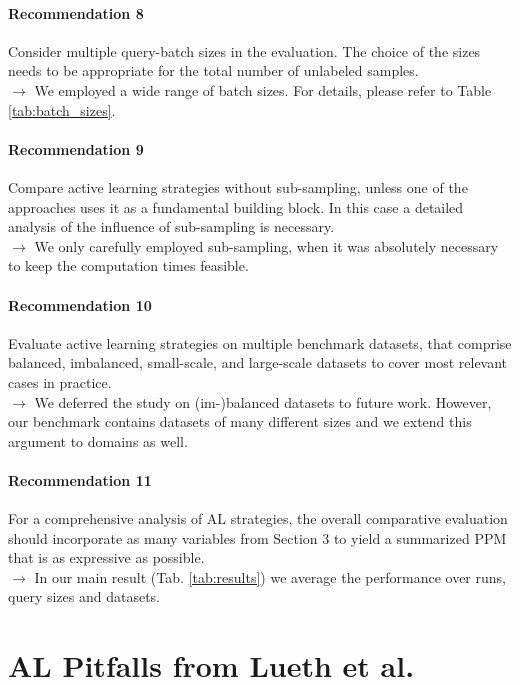 \documentclass[]{article}
\begin{document}
\paragraph{Recommendation 8} Consider multiple query-batch sizes
in the evaluation. The choice of the sizes needs to be
appropriate for the total number of unlabeled samples.\\
$\rightarrow$ We employed a wide range of batch sizes. For details, please refer to Table \ref{tab:batch_sizes}.

\paragraph{Recommendation 9} Compare active learning strategies
without sub-sampling, unless one of the approaches uses
it as a fundamental building block. In this case a detailed
analysis of the influence of sub-sampling is necessary.\\
$\rightarrow$ We only carefully employed sub-sampling, when it was absolutely necessary to keep the computation times feasible.

\paragraph{Recommendation 10} Evaluate active learning strategies
on multiple benchmark datasets, that comprise balanced,
imbalanced, small-scale, and large-scale datasets to cover
most relevant cases in practice.\\
$\rightarrow$ We deferred the study on (im-)balanced datasets to future work. However, our benchmark contains datasets of many different sizes and we extend this argument to domains as well.

\paragraph{Recommendation 11} For a comprehensive analysis of
AL strategies, the overall comparative evaluation should
incorporate as many variables from Section 3 to yield a
summarized PPM that is as expressive as possible. \\
$\rightarrow$ In our main result (Tab. \ref{tab:results}) we average the performance over runs, query sizes and datasets.


\section{AL Pitfalls from Lueth et al.}\label{app:pitfalls}
\end{document}
